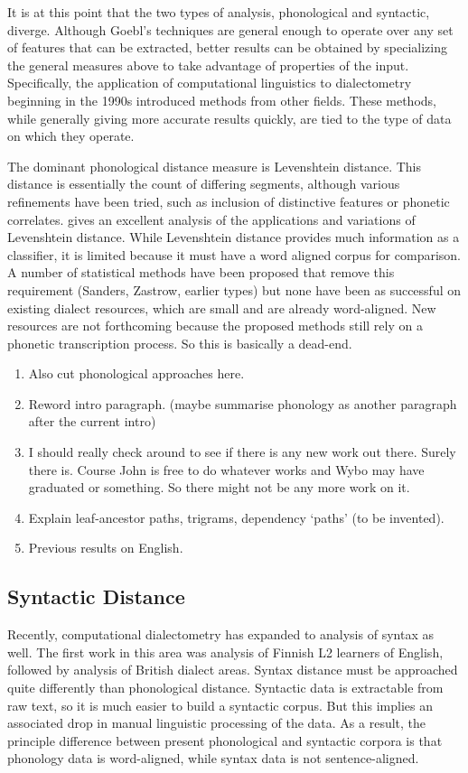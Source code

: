 \documentclass[11pt]{article}
\begin{document}
It is at this point that the two types of analysis, phonological and
syntactic, diverge. Although Goebl's techniques are general enough to
operate over any set of features that can be extracted, better results
can be obtained by specializing the general measures above to take
advantage of properties of the input.  Specifically, the application
of computational linguistics to dialectometry beginning in the 1990s
introduced methods from other fields. These methods, while generally
giving more accurate results quickly, are tied to the type of data on
which they operate.

The dominant phonological distance measure is Levenshtein
distance. This distance is essentially the count of differing
segments, although various refinements have been tried, such as
inclusion of distinctive features or phonetic
correlates.  gives an excellent analysis of the
applications and variations of Levenshtein distance. While Levenshtein
distance provides much information as a classifier, it is limited
because it must have a word aligned corpus for comparison. A number of
statistical methods have been proposed that remove this requirement
(Sanders, Zastrow, earlier types) but none have been as successful on
existing dialect resources, which are small and are already
word-aligned. New resources are not forthcoming because the proposed
methods still rely on a phonetic transcription process. So this is
basically a dead-end.

\begin{enumerate}
\item Also cut phonological approaches here.
\item Reword intro paragraph. (maybe summarise phonology as another
  paragraph after the current intro)
\item I should really check around to see if there is any new work out
  there. Surely there is. Course John is free to do whatever works and
  Wybo may have graduated or something. So there might not be any more
  work on it.
\item Explain leaf-ancestor paths, trigrams, dependency `paths' (to be
  invented).
\item Previous results on English.
\end{enumerate}

\subsection{Syntactic  Distance}
Recently, computational dialectometry has expanded to analysis of
syntax as well. The first work in this area was 
analysis of Finnish L2 learners of English, followed by
 analysis of British dialect areas. Syntax
distance must be approached quite differently than phonological
distance. Syntactic data is extractable from raw text, so it is much
easier to build a syntactic corpus. But this implies an associated
drop in manual linguistic processing of the data. As a result, the
principle difference between present phonological and syntactic
corpora is that phonology data is word-aligned, while syntax data is
not sentence-aligned.
\end{document}
